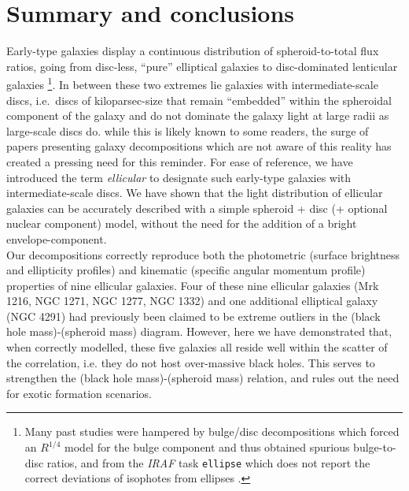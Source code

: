 \documentclass[useAMS,usenatbib,article]{mnras}
\begin{document}
\section{Summary and conclusions}
Early-type galaxies display a continuous distribution of spheroid-to-total flux ratios, 
going from disc-less, ``pure'' elliptical galaxies to disc-dominated lenticular galaxies 
\citep{michard1984,djorgovski1985,carter1987,capaccioli1987,capaccioli1988,franx1989,nieto1988,nieto1991,rixwhite1990,rixwhite1992,
vandenbergh1990,bender1990,scorzabender1990,scorzabender1995,
simienmichard1990,cinzanovandermarel1993,donofrio1995,graham1998fornax,scorza1998,scorzavandenbosch1998,
bendersaglia1999}\footnote{Many past studies were hampered by bulge/disc decompositions which forced an $R^{1/4}$ model for the bulge component 
and thus obtained spurious bulge-to-disc ratios, and from the \emph{IRAF} task {\tt ellipse} which does not report the correct deviations of isophotes 
from ellipses \citep{ciambur2015}.}. 
In between these two extremes lie galaxies with intermediate-scale discs, 
i.e.~discs of kiloparsec-size that remain ``embedded'' within the spheroidal component of the galaxy 
and do not dominate the galaxy light at large radii as large-scale discs do. 
while this is likely known to some readers, 
the surge of papers presenting galaxy decompositions which are not aware of this reality 
has created a pressing need for this reminder. 
For ease of reference, we have introduced the term \emph{ellicular} to designate such early-type galaxies with intermediate-scale discs. 
We have shown that the light distribution of ellicular galaxies can be accurately described 
with a simple spheroid + disc (+ optional nuclear component) model, 
without the need for the addition of a bright envelope-component. \\
Our decompositions correctly reproduce both the photometric (surface brightness and ellipticity profiles) 
and kinematic (specific angular momentum profile) properties of nine ellicular galaxies. 
Four of these nine ellicular galaxies (Mrk 1216, NGC 1271, NGC 1277, NGC 1332) and one additional elliptical galaxy (NGC 4291) 
had previously been claimed to be extreme outliers in the (black hole mass)-(spheroid mass) diagram. 
However, here we have demonstrated that, when correctly modelled, 
these five galaxies all reside well within the scatter of the correlation, 
i.e. they do not host over-massive black holes. 
This serves to strengthen the (black hole mass)-(spheroid mass) relation, 
and rules out the need for exotic formation scenarios. 
\end{document}
